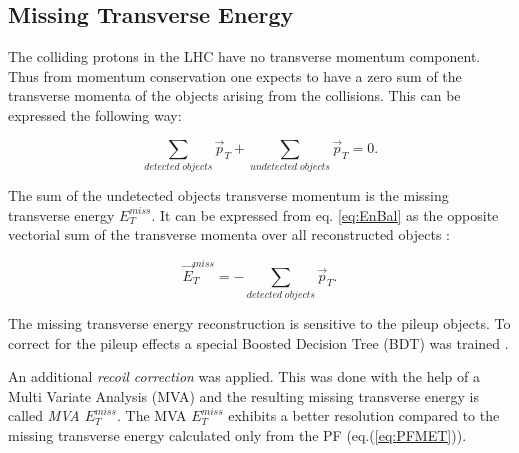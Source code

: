 \subsection{Missing Transverse Energy}

The colliding protons in the LHC have no transverse momentum component. Thus from momentum conservation one expects to have a zero sum of the transverse momenta of the 
objects arising from the collisions. This can be expressed the following way:

\begin{equation}\label{eq:EnBal}
 \sum_{detected\; objects} \vec{p}_{T} + \sum_{undetected\; objects} \vec{p}_{T} = 0.
\end{equation}

The sum of the undetected objects transverse momentum is the missing transverse energy $E_{T}^{miss}$.
It can be expressed from eq. \ref{eq:EnBal} as the opposite vectorial sum of the transverse momenta over all reconstructed objects \cite{CMS-PAS-PFT-09-001}:

\begin{equation}\label{eq:PFMET}
 \vec{E}^{miss}_{T} = - \sum_{detected\; objects} \vec{p}_{T}.
\end{equation}


The missing transverse energy reconstruction is sensitive to the pileup objects. To correct for the 
pileup effects a special Boosted Decision Tree (BDT) was trained \cite{CMS-PAS-JME-12-002}.

An additional \textit{recoil correction}\cite{TWikiMET} was applied. This was done with the help of a 
Multi Variate Analysis (MVA) and the resulting missing transverse energy is called \textit{MVA $E_{T}^{miss}$}.
The MVA $E_{T}^{miss}$ exhibits a better resolution compared to the 
missing transverse energy calculated only from the PF (eq.(\ref{eq:PFMET})).


